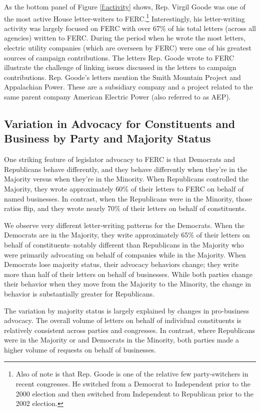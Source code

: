 \documentclass{article}
\begin{document}
As the bottom panel of Figure \ref{f:activity} shows, Rep. Virgil Goode was one of the most active House letter-writers to FERC.\footnote{Also of note is that Rep. Goode is one of the relative few party-switchers in recent congresses.  He switched from a Democrat to Independent prior to the 2000 election and then switched from Independent to Republican prior to the 2002 election.}  Interestingly, his letter-writing activity was largely focused on FERC with over 67\% of his total letters (across all agencies) written to FERC. During the period when he wrote the most letters, electric utility companies (which are overseen by FERC) were one of his greatest sources of campaign contributions. The letters Rep. Goode wrote to FERC illustrate the challenge of linking issues discussed in the letters to campaign contributions.  Rep. Goode's letters mention the Smith Mountain Project and Appalachian Power.  These are a subsidiary company and a project related to the same parent company American Electric Power (also referred to as AEP).  

\subsection{Variation in Advocacy for Constituents and Business by Party and Majority Status}

One striking feature of legislator advocacy to FERC is that Democrats and Republicans behave differently, and they behave differently when they're in the Majority versus when they're in the Minority.  When Republicans controlled the Majority, they wrote approximately 60\% of their letters to FERC on behalf of named businesses.  In contrast, when the Republicans were in the Minority, those ratios flip, and they wrote nearly 70\% of their letters on behalf of constituents.  

We observe very different letter-writing patterns for the Democrats.  When the Democrats are in the Majority, they write approximately 65\% of their letters on behalf of constituents--notably different than Republicans in the Majority who were primarily advocating on behalf of companies while in the Majority.  When Democrats lose majority status, their advocacy behaviors change; they write more than half of their letters on behalf of businesses. While both parties change their behavior when they move from the Majority to the Minority, the change in behavior is substantially greater for Republicans.  

The variation by majority status is largely explained by changes in pro-business advocacy. The overall volume of letters on behalf of individual constituents is relatively consistent across parties and congresses. In contrast, where Republicans were in the Majority or and Democrats in the Minority, both parties made a higher volume of requests on behalf of businesses. 
\end{document}
